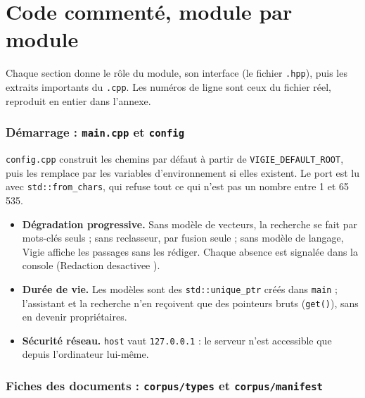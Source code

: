 \documentclass[11pt,a4paper]{article}
\newcommand{\fichier}[1]{\texttt{#1}}
\begin{document}
\part{Code commenté, module par module}

Chaque section donne le rôle du module, son interface (le fichier \texttt{.hpp}), puis les extraits importants du \texttt{.cpp}. Les numéros de ligne sont ceux du fichier réel, reproduit en entier dans l'annexe.

\section{Démarrage : \texttt{main.cpp} et \texttt{config}}

\fichier{config.cpp} construit les chemins par défaut à partir de \texttt{VIGIE\_DEFAULT\_ROOT}, puis les remplace par les variables d'environnement si elles existent. Le port est lu avec \texttt{std::from\_chars}, qui refuse tout ce qui n'est pas un nombre entre 1 et 65\,535.



\begin{itemize}
  \item \textbf{Dégradation progressive.} Sans modèle de vecteurs, la recherche se fait par mots-clés seuls ; sans reclasseur, par fusion seule ; sans modèle de langage, Vigie affiche les passages sans les rédiger. Chaque absence est signalée dans la console (\og Redaction desactivee \fg).
  \item \textbf{Durée de vie.} Les modèles sont des \texttt{std::unique\_ptr} créés dans \texttt{main} ; l'assistant et la recherche n'en reçoivent que des pointeurs bruts (\texttt{get()}), sans en devenir propriétaires.
  \item \textbf{Sécurité réseau.} \texttt{host} vaut \texttt{127.0.0.1} : le serveur n'est accessible que depuis l'ordinateur lui-même.
\end{itemize}

\section{Fiches des documents : \texttt{corpus/types} et \texttt{corpus/manifest}}
\end{document}
